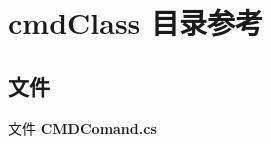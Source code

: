 \section{cmd\+Class 目录参考}
\label{dir_007a5f095379e947bd6c3162ab38b0c3}
\subsection*{文件}
\begin{DoxyCompactItemize}
\item 
文件 \textbf{ C\+M\+D\+Comand.\+cs}
\end{DoxyCompactItemize}
